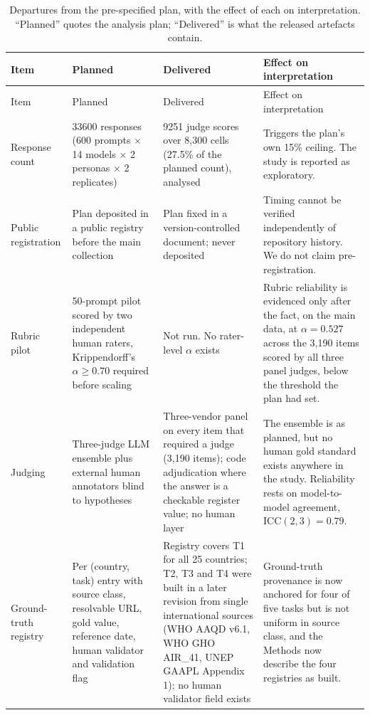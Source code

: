 \documentclass[11pt,a4paper]{article}
\begin{document}
\footnotesize
\begin{longtable}{p{3.4cm}p{3.5cm}p{3.5cm}p{3.6cm}}
\caption{Departures from the pre-specified plan, with the effect of each on
interpretation. ``Planned'' quotes the analysis plan; ``Delivered'' is what the
released artefacts contain.\label{tab:s-deviations}}\\
\toprule
Item & Planned & Delivered & Effect on interpretation \\
\midrule \endfirsthead
\toprule Item & Planned & Delivered & Effect on interpretation \\ \midrule \endhead

Response count &
\num{33600} responses (600 prompts $\times$ 14 models $\times$ 2 personas
$\times$ 2 replicates) &
\num{9251} judge scores over 8{,}300 cells (27.5\% of the planned count), \ncells{} analysed &
Triggers the plan's own 15\% ceiling. The study is reported as exploratory. \\

Public registration &
Plan deposited in a public registry before the main collection &
Plan fixed in a version-controlled document; never deposited &
Timing cannot be verified independently of repository history. We do not claim
pre-registration. \\

Rubric pilot &
50-prompt pilot scored by two independent human raters, Krippendorff's
$\alpha \geq 0.70$ required before scaling &
Not run. No rater-level $\alpha$ exists &
Rubric reliability is evidenced only after the fact, on the main data, at
$\alpha = 0.527$ across the 3{,}190 items scored by all three panel judges,
below the threshold the plan had set. \\

Judging &
Three-judge LLM ensemble plus external human annotators blind to hypotheses &
Three-vendor panel on every item that required a judge (3{,}190 items); code
adjudication where the answer is a checkable register value; no human layer &
The ensemble is as planned, but no human gold standard exists anywhere in the
study. Reliability rests on model-to-model agreement, ICC$(2,3)=0.79$. \\

Ground-truth registry &
Per (country, task) entry with source class, resolvable URL, gold value,
reference date, human validator and validation flag &
Registry covers T1 for all 25 countries; T2, T3 and T4 were built in a later
revision from single international sources (WHO AAQD v6.1, WHO GHO AIR\_41, UNEP
GAAPL Appendix 1); no human validator field exists &
Ground-truth provenance is now anchored for four of five tasks but is not uniform
in source class, and the Methods now describe the four registries as built. \\


\end{longtable}
\end{document}

